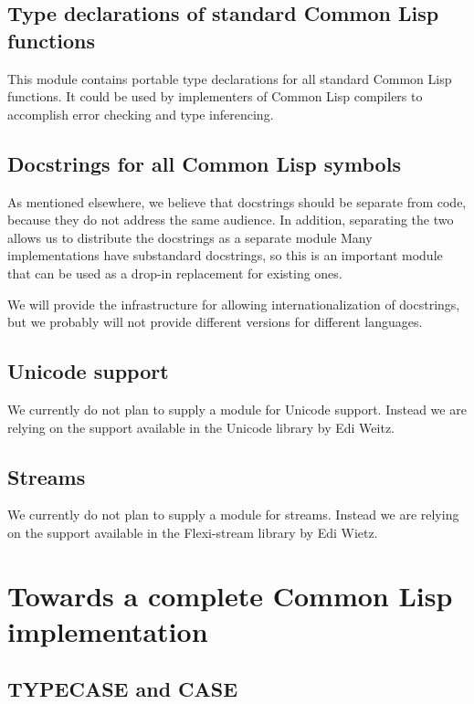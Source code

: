 \documentclass{article}
\begin{document}
\subsection{Type declarations of standard Common Lisp functions}

This module contains portable type declarations for all standard
Common Lisp functions.  It could be used by implementers of Common
Lisp compilers to accomplish error checking and type inferencing. 

\subsection{Docstrings for all Common Lisp symbols}

As mentioned elsewhere, we believe that docstrings should be separate
from code, because they do not address the same audience.  In
addition, separating the two allows us to distribute the docstrings as
a separate module Many implementations have substandard docstrings, so
this is an important module that can be used as a drop-in replacement
for existing ones.

We will provide the infrastructure for allowing internationalization
of docstrings, but we probably will not provide different versions for
different languages. 

\subsection{Unicode support}

We currently do not plan to supply a module for Unicode support.
Instead we are relying on the support available in the Unicode library
by Edi Weitz.

\subsection{Streams}

We currently do not plan to supply a module for streams.  Instead we
are relying on the support available in the Flexi-stream library by
Edi Wietz.

\section{Towards a complete Common Lisp implementation}

\subsection{TYPECASE and CASE}
\end{document}

